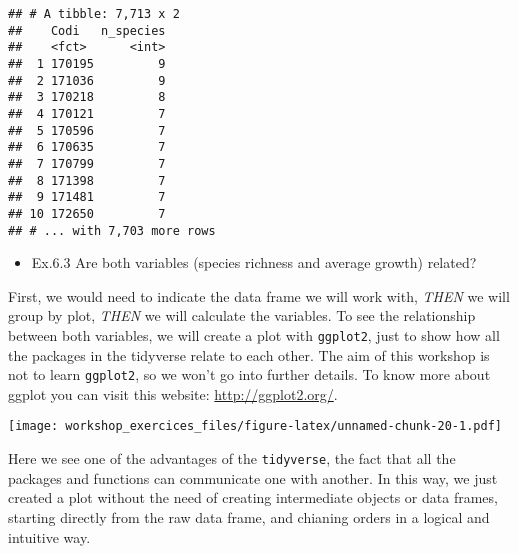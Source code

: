 \documentclass[]{article}
\newenvironment{Shaded}{\begin{snugshade}}{\end{snugshade}}
\newcommand{\KeywordTok}[1]{\textcolor[rgb]{0.13,0.29,0.53}{\textbf{#1}}}
\newcommand{\DataTypeTok}[1]{\textcolor[rgb]{0.13,0.29,0.53}{#1}}
\newcommand{\StringTok}[1]{\textcolor[rgb]{0.31,0.60,0.02}{#1}}
\newcommand{\OperatorTok}[1]{\textcolor[rgb]{0.81,0.36,0.00}{\textbf{#1}}}
\newcommand{\NormalTok}[1]{#1}
\providecommand{\tightlist}{%
  \setlength{\itemsep}{0pt}\setlength{\parskip}{0pt}}
\begin{document}
\begin{verbatim}
## # A tibble: 7,713 x 2
##    Codi   n_species
##    <fct>      <int>
##  1 170195         9
##  2 171036         9
##  3 170218         8
##  4 170121         7
##  5 170596         7
##  6 170635         7
##  7 170799         7
##  8 171398         7
##  9 171481         7
## 10 172650         7
## # ... with 7,703 more rows
\end{verbatim}

\begin{itemize}
\tightlist
\item
  Ex.6.3 Are both variables (species richness and average growth)
  related?
\end{itemize}

First, we would need to indicate the data frame we will work with,
\emph{THEN} we will group by plot, \emph{THEN} we will calculate the
variables. To see the relationship between both variables, we will
create a plot with \texttt{ggplot2}, just to show how all the packages
in the tidyverse relate to each other. The aim of this workshop is not
to learn \texttt{ggplot2}, so we won't go into further details. To know
more about ggplot you can visit this website: \url{http://ggplot2.org/}.

\begin{Shaded}
\end{Shaded}

\texttt{[image: workshop\_exercices\_files/figure-latex/unnamed-chunk-20-1.pdf]}

Here we see one of the advantages of the \texttt{tidyverse}, the fact
that all the packages and functions can communicate one with another. In
this way, we just created a plot without the need of creating
intermediate objects or data frames, starting directly from the raw data
frame, and chianing orders in a logical and intuitive way.
\end{document}
